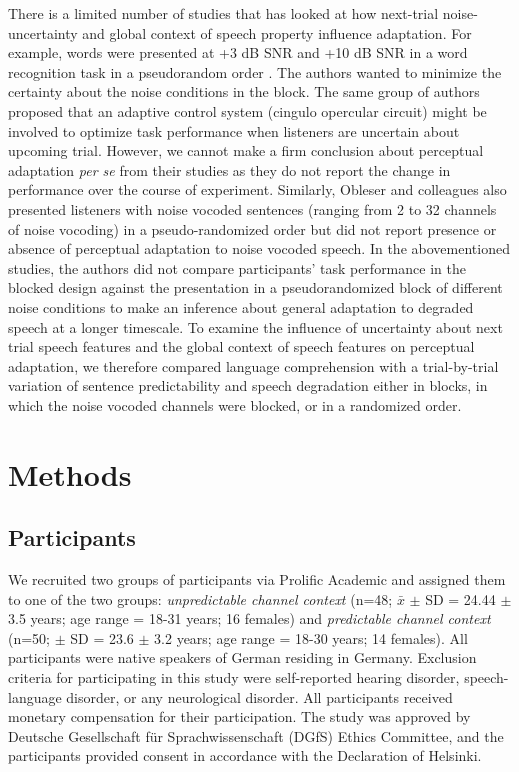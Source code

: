 \documentclass[a4paper, nobind]{templates/ociamthesis}
\begin{document}
There is a limited number of studies that has looked at how next-trial noise-uncertainty and global context of speech property influence adaptation.
For example, words were presented at +3 dB SNR and +10 dB SNR in a word recognition task in a pseudorandom order \autocite{Vaden2013}.
The authors wanted to minimize the certainty about the noise conditions in the block.
The same group of authors \autocite{Vaden2015a,Vaden2015b,Eckert2016} proposed that an adaptive control system (cingulo opercular circuit) might be involved to optimize task performance when listeners are uncertain about upcoming trial.
However, we cannot make a firm conclusion about perceptual adaptation \emph{per se} from their studies as they do not report the change in performance over the course of experiment.
Similarly, Obleser and colleagues \autocite{Obleser2007,Obleser2011,Hartwigsen2015} also presented listeners with noise vocoded sentences (ranging from 2 to 32 channels of noise vocoding) in a pseudo-randomized order but did not report presence or absence of perceptual adaptation to noise vocoded speech.
In the abovementioned studies, the authors did not compare participants' task performance in the blocked design against the presentation in a pseudorandomized block of different noise conditions to make an inference about general adaptation to degraded speech at a longer timescale.
To examine the influence of uncertainty about next trial speech features and the global context of speech features on perceptual adaptation, we therefore compared language comprehension with a trial-by-trial variation of sentence predictability and speech degradation either in blocks, in which the noise vocoded channels were blocked, or in a randomized order.

\hypertarget{methods-2}{%
\section{Methods}\label{methods-2}}

\hypertarget{participants-1}{%
\subsection{Participants}\label{participants-1}}

We recruited two groups of participants via Prolific Academic and assigned them to one of the two groups:
\emph{unpredictable channel context} (n=48; \(\bar{x}\) \(\pm\) SD = 24.44 \(\pm\) 3.5 years; age range = 18-31 years; 16 females) and \emph{predictable channel context} (n=50; \(\pm\) SD = 23.6 \(\pm\) 3.2 years; age range = 18-30 years; 14 females).
All participants were native speakers of German residing in Germany.
Exclusion criteria for participating in this study were self-reported hearing disorder, speech-language disorder, or any neurological disorder.
All participants received monetary compensation for their participation.
The study was approved by Deutsche Gesellschaft für Sprachwissenschaft (DGfS) Ethics Committee, and the participants provided consent in accordance with the Declaration of Helsinki.
\end{document}
